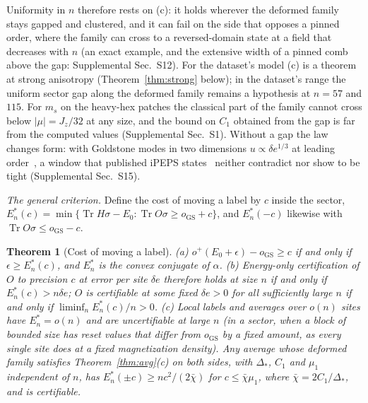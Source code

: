 \documentclass[aps,prx,twocolumn,10pt,superscriptaddress,nofootinbib,longbibliography,floatfix]{revtex4-2}
\newtheorem{theorem}{Theorem}
\theoremstyle{remark}
\newcommand{\Jz}{J_z}
\newcommand{\ms}{m_s}
\newcommand{\de}{\delta e}
\newcommand{\Tr}{\operatorname{Tr}}
\newcommand{\GS}{\mathrm{GS}}
\begin{document}
Uniformity in $n$ therefore rests on (c): it holds wherever the deformed family stays gapped and clustered, and it
can fail on the side that opposes a pinned order, where the family can cross to a reversed-domain state at a field
that decreases with $n$ (an exact example, and the extensive width of a pinned comb above the gap: Supplemental
Sec.~S12). For the dataset's model (c) is a theorem at strong anisotropy (Theorem~\ref{thm:strong} below); in the
dataset's range the uniform sector gap along the deformed family remains a hypothesis at $n=57$ and $115$. For $\ms$
on the heavy-hex patches the classical part of the family cannot cross below $|\mu|=\Jz/32$ at any size, and the %
bound on $C_1$ obtained from the gap is far from the computed values (Supplemental Sec.~S1).
Without a gap the law changes form: with Goldstone modes in two dimensions $u\propto\de^{1/3}$ at leading %
order~\cite{hofmann2020}, a window that published iPEPS states~\cite{hasik2021} neither contradict nor show to be
tight (Supplemental Sec.~S15).

\emph{The general criterion.} Define the cost of moving a label by $c$ inside the sector,
$E_n^*(c)=\min\{\Tr H\sigma-E_0:\Tr O\sigma\ge o_\GS+c\}$, and $E_n^*(-c)$ likewise with $\Tr O\sigma\le o_\GS-c$.

\begin{theorem}[Cost of moving a label]
\label{thm:cost}
(a) $o^+(E_0+\epsilon)-o_\GS\ge c$ if and only if $\epsilon\ge E^*_n(c)$, and $E^*_n$ is the convex conjugate of
$\alpha$.
(b) Energy-only certification of $O$ to precision $c$ at error per site $\de$ therefore holds at size $n$ if and only
if $E^*_n(c)>n\de$; $O$ is certifiable at some fixed $\de>0$ for all sufficiently large $n$ if and only if
$\liminf_nE^*_n(c)/n>0$.
(c) Local labels and averages over $o(n)$ sites have $E^*_n=o(n)$ and are uncertifiable at large $n$ (in a sector,
when a block of bounded size has reset values that differ from $o_\GS$ by a fixed amount, as every single site
does at a fixed magnetization density). Any average
whose deformed family satisfies Theorem~\ref{thm:avg}(c) on both sides, with $\Delta_*$, $C_1$ and $\mu_1$
independent of $n$, has $E^*_n(\pm c)\ge nc^2/(2\bar\chi)$ for $c\le\bar\chi\mu_1$, where $\bar\chi=2C_1/\Delta_*$,
and is certifiable.
\end{theorem}
\end{document}
